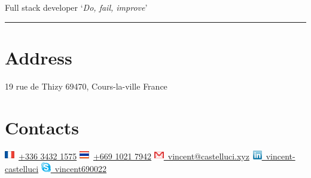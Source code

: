 \documentclass[]{friggeri-cv}
\begin{document}
      {Full stack developer}
\hfill \lq\textit{Do, fail, improve}\rq

\rule{397pt}{8pt}

\begin{aside}
  \section{Address}
  \hspace{1cm}
    19 rue de Thizy
    69470, Cours-la-ville
    France
  \section{Contacts}
  \hspace{1cm}
    \includegraphics[scale=0.60]{img/france.png}~\href{tel:+33634321575}{+336 3432 1575}
    \includegraphics[scale=0.60]{img/thailand.png}~\href{tel:+66910217942}{+669 1021 7942}
    \hspace{-2cm}\href{mailto:vincent.castelluci@gmail.com}{\includegraphics[scale=0.60]{img/mail.png}~vincent@castelluci.xyz}
    \href{https://www.linkedin.com/in/vincent-castelluci-363939170}{\includegraphics[scale=0.60]{img/linkedin.png}~vincent-castelluci}
    \href{skype://vincent690022?userinfo}{\includegraphics[scale=0.60]{img/skype.png}~vincent690022}
    ~

\end{aside}
\end{document}
